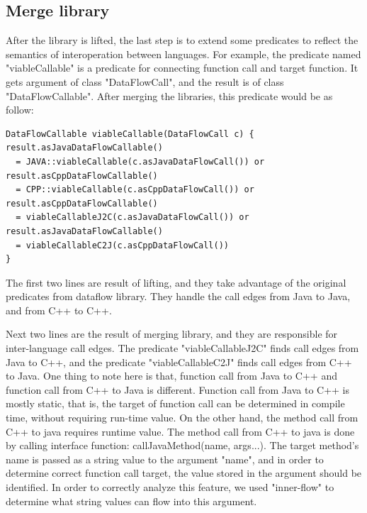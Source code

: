 \subsection{Merge library}

After the library is lifted, the last step is to extend some predicates to reflect the
semantics of interoperation between languages. For example, the predicate named "viableCallable"
is a predicate for connecting function call and target function. It gets argument of class "DataFlowCall",
and the result is of class "DataFlowCallable". After merging the libraries, this predicate would be as follow:

\begin{lstlisting}[style=codeql,xleftmargin=2.5em]
DataFlowCallable viableCallable(DataFlowCall c) {
result.asJavaDataFlowCallable()
  = JAVA::viableCallable(c.asJavaDataFlowCall()) or
result.asCppDataFlowCallable()
  = CPP::viableCallable(c.asCppDataFlowCall()) or
result.asCppDataFlowCallable()
  = viableCallableJ2C(c.asJavaDataFlowCall()) or
result.asJavaDataFlowCallable()
  = viableCallableC2J(c.asCppDataFlowCall())
}
\end{lstlisting}

The first two lines are result of lifting, and they take advantage of the
original predicates from dataflow library.  They handle the call edges from
Java to Java, and from C++ to C++.

Next two lines are the result of merging library, and they are responsible for
inter-language call edges.  The predicate "viableCallableJ2C" finds call edges
from Java to C++, and the predicate "viableCallableC2J" finds call edges from
C++ to Java. One thing to note here is that, function call from Java to C++
and function call from C++ to Java is different. Function call from Java to C++
is mostly static, that is, the target of function call can be determined in compile
time, without requiring run-time value. On the other hand, the method call from C++
to java requires runtime value. The method call from C++ to java is done by calling
interface function: callJavaMethod(name, args...). The target
method's name is passed as a string value to the argument "name",
and in order to determine correct function call target, the value stored in the argument
should be identified. In order to correctly analyze this feature, we used "inner-flow"
to determine what string values can flow into this argument.
